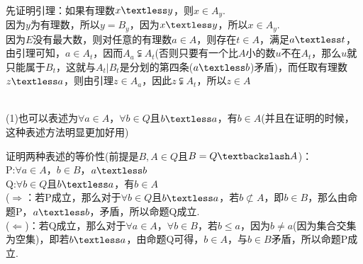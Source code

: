 \documentclass[12pt, a4paper, oneside]{ctexart}
\begin{document}
\begin{remark}\\
先证明引理：如果有理数$x\textless y$，则$x\in A_y$.\\
因为$y$为有理数，所以$y=B_y$，因为$x\textless y$，所以$x \in A_y$.\\
因为$E$没有最大数，则对任意的有理数$a\in A$，则存在$t\in A$，满足$a\textless t$，由引理可知，$a\in A_t$，因而$A_a \subsetneqq A_t$(否则只要有一个比$A$小的数$u$不在$A_t$，那么$u$就只能属于$B_t$，这就与$A_t|B_t$是分划的第四条($a\textless b$)矛盾)，而任取有理数$z\textless a$，则由引理$z\in A_a$，因此$z\subsetneqq A_t$，所以$z\in A$

\end{remark}
\begin{note}\\
(1)也可以表述为$\forall a \in A$，$\forall b\in Q$且$b \textless a$，有$b\in A$(并且在证明的时候，这种表述方法明显更加好用)\\
\end{note}
\begin{note}
证明两种表述的等价性(前提是$B,A\in Q$且$B=Q\textbackslash A$)：\\
P:$\forall a\in A$，$b\in B$，$a\textless b$\\
Q:$\forall b\in Q$且$b \textless a$，有$b\in A$\\
($\Rightarrow$：若P成立，那么对于$\forall b\in Q$且$b\textless a$，若$b\not\subset A$，即$b\in B$，那么由命题P，$a\textless b$，矛盾，所以命题Q成立.\\
($\Leftarrow$)：若Q成立，那么对于$\forall a\in A$，$\forall b\in B$，若$b\leq a$，因为$b\neq a$(因为集合交集为空集)，即若$b\textless a$，由命题Q可得，$b\in A$，与$b\in B$矛盾，所以命题P成立. 
\end{note}
\end{document}
